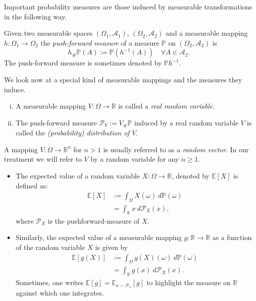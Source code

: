 Important probability measures are those induced by measurable transformations in the following way. 
\begin{definition}
	Given two measurable spaces $(\Omega_1, \mathcal{A}_1)$, $(\Omega_2, \mathcal{A}_2)$ and a measurable mapping $h:\Omega_1 \to \Omega_2$ 
	the \emph{push-forward measure} of a measure $\mathbb{P}$ on $(\Omega_2, \mathcal{A}_2)$ is 
	$$
	h_\#\mathbb{P} (A) := \mathbb{P} (h^{-1}(A)) \quad  \forall A \in \mathcal{A}_2.
	$$
	The push-forward measure is sometimes denoted by $\mathbb{P} h^{-1}$.
\end{definition}

We look now at a special kind of measurable mappings and the measures they induce.
\begin{definition}
	\label{def:RV}
	\begin{enumerate}[(i)] Let $(\Omega,\mathcal{A}, \mathbb{P})$ be a probability measure space.
		\item A measurable mapping $V: \Omega \to \mathbb{R}$ is called a \emph{real random variable}.
		\item The push-forward measure $\mathcal{P}_V := V_\# \mathbb{P}$ induced by a real random variable $V$ 
		is called the \emph{(probability) distribution of $V$}.		
	\end{enumerate}
\end{definition}
A mapping $V: \Omega \to \mathbb{R}^n$ for $n>1$ is usually referred to as a
\emph{random vector}. In our treatment we will refer to $V$ by a random variable
for any $n\geq 1$. 
\begin{definition}
	\begin{itemize}
		\item The expected value of a random variable $X: \Omega \to
		\mathbb{R}$, denoted by $\mathbb{E}[X]$
		is defined as:
		\begin{align*}
			\mathbb{E}[X] &:= \int_\Omega X(\omega) \ d\mathbb{P}(\omega) \\
			& = \int_\mathbb{R} x \ d\mathcal{P}_X(x),
		\end{align*}
		where $\mathcal{P}_X$ is the pushforward-measure of $X$.
		\item Similarly, the expected value of a measurable mapping $g:
		\mathbb{R}\to \mathbb{R}$ as a function of the random variable $X$ is given by 
		\begin{align*}
			\mathbb{E}[g(X)] &:= \int_\Omega g(X)(\omega) \ d\mathbb{P}(\omega) \\
			& = \int_\mathbb{R} g(x) \ d\mathcal{P}_X(x).
		\end{align*}
		Sometimes, one writes $\mathbb{E}[g] = \mathbb{E}_{x \sim \mathcal{P}_x}[g]$
		to highlight the measure on $\mathbb{R}$ against which one integrates.
	\end{itemize}
\end{definition}


